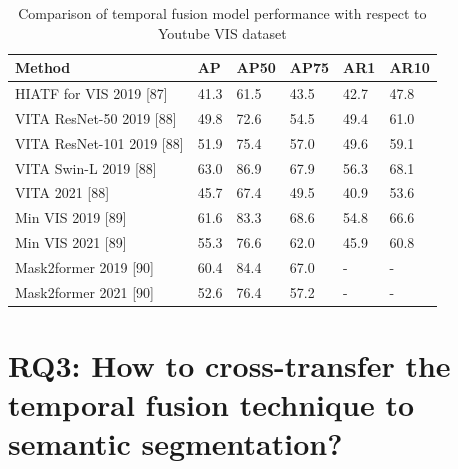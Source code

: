 	\begin{table}[h]
   		\begin{center}
   			\begin{tabular}{ | l | l| l| l| l| p{2cm} |}
   				\hline
   				
   				\cellcolor{purple!30}Method & \cellcolor{purple!30}AP & \cellcolor{purple!30}AP50 & \cellcolor{purple!30}AP75 & \cellcolor{purple!30}AR1 & \cellcolor{purple!30}AR10 \\ \hline
   				HIATF for VIS 2019 [87] & 41.3 & 61.5 & 43.5 & 42.7 & 47.8 \\ \hline
   				VITA ResNet-50 2019 [88]  & 49.8 & 72.6 & 54.5 & 49.4 & 61.0  \\ \hline
   				VITA ResNet-101 2019 [88]  & 51.9 & 75.4 & 57.0 & 49.6 & 59.1 \\ \hline
   				VITA Swin-L 2019 [88]  & 63.0 & 86.9 & 67.9 & 56.3 & 68.1 \\ \hline
   				VITA 2021 [88]  & 45.7 & 67.4 & 49.5 & 40.9 & 53.6 \\ \hline
   				Min VIS 2019 [89] & 61.6 & 83.3 & 68.6 & 54.8 & 66.6 \\ \hline
   				Min VIS 2021 [89] & 55.3 & 76.6 & 62.0 & 45.9 & 60.8 \\ \hline
   				Mask2former 2019 [90]  & 60.4 & 84.4 & 67.0 & - & - \\ \hline
   				Mask2former 2021 [90]  & 52.6 & 76.4 & 57.2 & - & - \\ \hline
   				\hline
   			\end{tabular}
   			\caption{Comparison of temporal fusion model performance with respect to Youtube VIS dataset}
   			\label{tab:sota_ytube_vis}
   		\end{center}
   	\end{table}
    
    \section{RQ3: How to cross-transfer the temporal fusion technique to semantic segmentation?}
    
